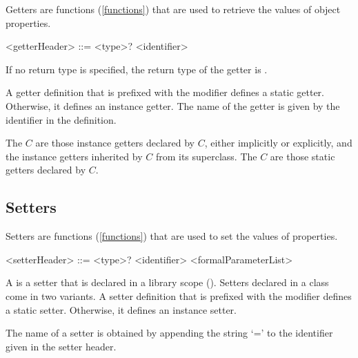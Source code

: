 \documentclass[makeidx]{article}
\begin{document}
\LMHash{}%
Getters are functions (\ref{functions}) that are used
to retrieve the values of object properties.

\begin{grammar}
<getterHeader> ::= <type>? \GET{} <identifier>
\end{grammar}

\LMHash{}%
If no return type is specified, the return type of the getter is \DYNAMIC.

\LMHash{}%
A getter definition that is prefixed with the \STATIC{} modifier defines
a static getter.
Otherwise, it defines an instance getter.
The name of the getter is given by the identifier in the definition.

\LMHash{}%
The  $C$ are
those instance getters declared by $C$,
either implicitly or explicitly,
and the instance getters inherited by $C$ from its superclass.
The  $C$ are
those static getters declared by $C$.



\subsection{Setters}

\LMHash{}%
Setters are functions (\ref{functions}) that are used to set
the values of properties.

\begin{grammar}
<setterHeader> ::= <type>? \SET{} <identifier> <formalParameterList>
\end{grammar}


\LMHash{}%
A  is a setter that is declared in a library scope
().
Setters declared in a class come in two variants.
A setter definition that is prefixed with the \STATIC{} modifier defines
a static setter.
Otherwise, it defines an instance setter.

\LMHash{}%
The name of a setter is obtained by appending the string `=' to
the identifier given in the setter header.
\end{document}
